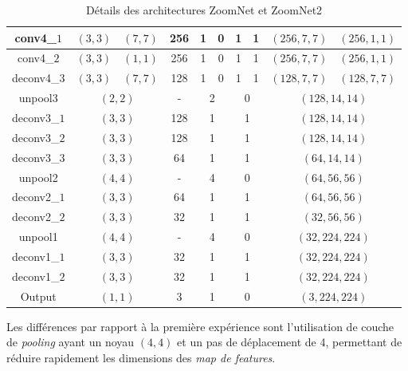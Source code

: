 \documentclass[a4paper, 11pt]{report}
\begin{document}
\begin{table}[H]
\begin{tabular}{|c|c|c|c|c|c|c|c|c|c|c|}
	\hline 
	conv4\_$1$ & $(3,3)$ & $(7, 7)$ & \multicolumn{2}{c|}{256} & 1 & 0 & 1 & 1 & $(256, 7, 7)$ & $(256, 1, 1)$ \\
	\hline
	conv4\_$2$ & $(3,3)$ & $(1, 1)$ & \multicolumn{2}{c|}{256} & 1 & 0 & 1 & 1 & $(256, 7, 7)$ & $(256, 1, 1)$ \\
	\hline
	deconv4\_$3$ & $(3,3)$ & $(7, 7)$ & \multicolumn{2}{c|}{128} & 1 & 0 & 1 & 1 & $(128, 7, 7)$ & $(128, 7, 7)$ \\
	\hline
	unpool3 & \multicolumn{2}{c|}{$(2, 2)$} & \multicolumn{2}{c|}{-} & \multicolumn{2}{c|}{2} & \multicolumn{2}{c|}{0} & \multicolumn{2}{c|}{$(128, 14, 14)$}\\ 
	\hline
	deconv3\_$1$ & \multicolumn{2}{c|}{$(3, 3)$} & \multicolumn{2}{c|}{128} & \multicolumn{2}{c|}{1} & \multicolumn{2}{c|}{1} & \multicolumn{2}{c|}{$(128, 14, 14)$}\\ 
	\hline
	deconv3\_$2$ & \multicolumn{2}{c|}{$(3, 3)$} & \multicolumn{2}{c|}{128} & \multicolumn{2}{c|}{1} & \multicolumn{2}{c|}{1} & \multicolumn{2}{c|}{$(128, 14, 14)$}\\ 
	\hline
	deconv3\_$3$ & \multicolumn{2}{c|}{$(3, 3)$} & \multicolumn{2}{c|}{64} & \multicolumn{2}{c|}{1} & \multicolumn{2}{c|}{1} & \multicolumn{2}{c|}{$(64, 14, 14)$}\\ 
	\hline
	unpool2 & \multicolumn{2}{c|}{$(4, 4)$} & \multicolumn{2}{c|}{-} & \multicolumn{2}{c|}{4} & \multicolumn{2}{c|}{0} & \multicolumn{2}{c|}{$(64, 56, 56)$}\\ 
	\hline
	deconv2\_$1$ & \multicolumn{2}{c|}{$(3, 3)$} & \multicolumn{2}{c|}{64} & \multicolumn{2}{c|}{1} & \multicolumn{2}{c|}{1} & \multicolumn{2}{c|}{$(64, 56, 56)$}\\ 
	\hline
	deconv2\_$2$ & \multicolumn{2}{c|}{$(3, 3)$} & \multicolumn{2}{c|}{32} & \multicolumn{2}{c|}{1} & \multicolumn{2}{c|}{1} & \multicolumn{2}{c|}{$(32, 56, 56)$}\\ 
	\hline
	unpool1 & \multicolumn{2}{c|}{$(4, 4)$} & \multicolumn{2}{c|}{-} & \multicolumn{2}{c|}{4} & \multicolumn{2}{c|}{0} & \multicolumn{2}{c|}{$(32, 224, 224)$}\\ 
	\hline
	deconv1\_$1$ & \multicolumn{2}{c|}{$(3, 3)$} & \multicolumn{2}{c|}{32} & \multicolumn{2}{c|}{1} & \multicolumn{2}{c|}{1} & \multicolumn{2}{c|}{$(32, 224, 224)$}\\ 
	\hline
	deconv1\_$2$ & \multicolumn{2}{c|}{$(3, 3)$} & \multicolumn{2}{c|}{32} & \multicolumn{2}{c|}{1} & \multicolumn{2}{c|}{1} & \multicolumn{2}{c|}{$(32, 224, 224)$}\\ 
	\hline
	Output & \multicolumn{2}{c|}{$(1, 1)$} & \multicolumn{2}{c|}{3} & \multicolumn{2}{c|}{1} & \multicolumn{2}{c|}{0} & \multicolumn{2}{c|}{$(3, 224, 224)$}\\ 
	\hline
	\end{tabular}
	\caption{Détails des architectures ZoomNet et ZoomNet2}
\end{table}
Les différences par rapport à la première expérience sont l'utilisation de couche de \emph{pooling} ayant un noyau $(4, 4)$ et un pas de déplacement de 4, permettant de réduire rapidement les dimensions des \emph{map de features}.
\end{document}
